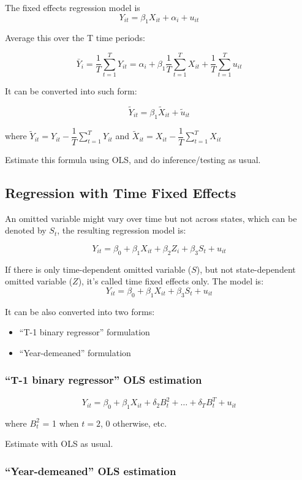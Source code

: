 \documentclass{article}
\newcommand{\sumlimitsT}{\sum \limits _{t=1}^{T}}
\begin{document}
The fixed effects regression model is
\[
	Y_{it} = \beta_1 X_{it} + \alpha_i + u_{it}
\]

Average this over the T time periods:

\[
	\bar{Y}_i = \dfrac{1}{T} \sumlimitsT Y_{it}
			= \alpha_i + \beta_1 \dfrac{1}{T} \sumlimitsT X_{it} + \dfrac{1}{T} \sumlimitsT u_{it}
\]

It can be converted into such form:

\[
	\tilde{Y}_{it} = \beta_1 \tilde{X}_{it} + \tilde{u}_{it}
\]

where $\tilde{Y}_{it} = Y_{it} - \dfrac{1}{T} \sumlimitsT Y_{it}$ and $\tilde{X}_{it} = X_{it} - \dfrac{1}{T} \sumlimitsT X_{it}$

Estimate this formula using OLS, and do inference/testing as usual.


\subsection{Regression with Time Fixed Effects}

An omitted variable might vary over time but not across states, which can be denoted by $S_t$, the resulting regression model is:

\[
	Y_{it} = \beta_0 + \beta_1 X_{it} + \beta_2 Z_i + \beta_3 S_t + u_{it}
\]

If there is only time-dependent omitted variable ($S$), but not state-dependent omitted variable ($Z$),
it's called time fixed effects only. The model is:
\[
	Y_{it} = \beta_0 + \beta_1 X_{it} + \beta_3 S_t + u_{it}
\]

It can be also converted into two forms:
\begin{itemize}
	\item ``T-1 binary regressor'' formulation
	\item ``Year-demeaned'' formulation
\end{itemize}

\subsubsection{``T-1 binary regressor'' OLS estimation}

\[
	Y_{it} = \beta_0 + \beta_1 X_{it} + \delta_2 B^{2}_{t} + \ldots + \delta_T B^{T}_{t} + u_{it}
\]

where $B^2_t$ = 1 when $t=2$, 0 otherwise, etc.

Estimate with OLS as usual.

\subsubsection{``Year-demeaned'' OLS estimation}
\end{document}
